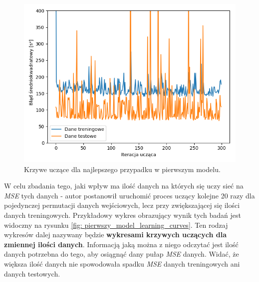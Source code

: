 \documentclass[12pt]{aghdpl}
\newenvironment{tightcenter}{
  \setlength\topsep{0pt}
  \setlength\parskip{0pt}
  \begin{center}
}{
  \end{center}
}
\begin{document}
		\begin{figure}[h]
	 		\begin{tightcenter}
	 			\includegraphics[width = \linewidth]{wykresy/1_pierwszy_model_tworzenie_i_analiza/wykres_uczenia.png}
	 		\end{tightcenter}
	 		
 			\caption{Krzywe uczące dla najlepszego przypadku w pierwszym modelu.}
			\label{fig: pierwszy_model_wykres_uczenia}
		\end{figure}
		
		W celu zbadania tego, jaki wpływ ma ilość danych na których się uczy sieć na \textit{MSE} tych danych - autor postanowił uruchomić proces uczący kolejne 20 razy dla pojedynczej permutacji danych wejściowych, lecz przy zwiększającej się ilości danych treningowych. Przykładowy wykres obrazujący wynik tych badań jest widoczny na rysunku \ref{fig: pierwszy_model_learning_curves}. Ten rodzaj wykresów dalej nazywany będzie \textbf{wykresami krzywych uczących dla zmiennej ilości danych}. Informacją jaką można z niego odczytać jest ilość danych potrzebna do tego, aby osiągnąć dany pułap \textit{MSE} danych. Widać, że większa ilość danych nie spowodowała spadku \textit{MSE} danych treningowych ani danych testowych.
		
\end{document}
